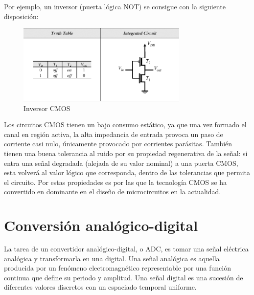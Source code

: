 \documentclass[12pt]{report} %
\begin{document}
	Por ejemplo, un inversor (puerta lógica NOT) se consigue con la siguiente disposición:
	
	\begin{figure}[H]
		\includegraphics[width=0.75\textwidth]{inverter_mos.jpg}
		\caption[Inversor CMOS]{Inversor CMOS\protect\footnotemark}
		\label{fig:inverter_mos.jpg}
	\end{figure}
	
	
	Los circuitos CMOS tienen un bajo consumo estático, ya que una vez formado el canal en región activa, la alta impedancia de entrada provoca un paso de corriente casi nulo, únicamente provocado por corrientes parásitas. También tienen una buena tolerancia al ruido por su propiedad regenerativa de la señal: si entra una señal degradada (alejada de su valor nominal) a una puerta CMOS, esta volverá al valor lógico que corresponda, dentro de las tolerancias que permita el circuito. Por estas propiedades es por las que la tecnología CMOS se ha convertido en dominante en el diseño de microcircuitos en la actualidad.
	
	\section{Conversión analógico-digital}
	
	La tarea de un convertidor analógico-digital, o ADC, es tomar una señal eléctrica analógica y transformarla en una digital. Una señal analógica es aquella producida por un fenómeno electromagnético representable por una función continua que define su periodo y amplitud. Una señal digital es una sucesión de diferentes valores discretos con un espaciado temporal uniforme.
	
\end{document}
